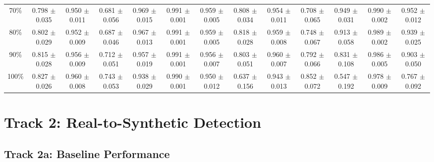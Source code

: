 \documentclass[11pt]{article}
\begin{document}
\begin{table}[ht]
{\begin{tabular}{ccccccccccccc}
70\% & 0.798 $\pm$ 0.035 & 0.950 $\pm$ 0.011 & 0.681 $\pm$ 0.056 & 0.969 $\pm$ 0.015 & 0.991 $\pm$ 0.001 & 0.959 $\pm$ 0.005 & 0.808 $\pm$ 0.034 & 0.954 $\pm$ 0.011 & 0.708 $\pm$ 0.065 & 0.949 $\pm$ 0.031 & 0.990 $\pm$ 0.002 & 0.952 $\pm$ 0.012 \\
80\% & 0.802 $\pm$ 0.029 & 0.952 $\pm$ 0.009 & 0.687 $\pm$ 0.046 & 0.967 $\pm$ 0.013 & 0.991 $\pm$ 0.001 & 0.959 $\pm$ 0.005 & 0.818 $\pm$ 0.028 & 0.959 $\pm$ 0.008 & 0.748 $\pm$ 0.067 & 0.913 $\pm$ 0.058 & 0.989 $\pm$ 0.002 & 0.939 $\pm$ 0.025 \\
90\% & 0.815 $\pm$ 0.028 & 0.956 $\pm$ 0.009 & 0.712 $\pm$ 0.051 & 0.957 $\pm$ 0.019 & 0.991 $\pm$ 0.001 & 0.956 $\pm$ 0.007 & 0.803 $\pm$ 0.051 & 0.960 $\pm$ 0.007 & 0.792 $\pm$ 0.066 & 0.831 $\pm$ 0.108 & 0.986 $\pm$ 0.005 & 0.903 $\pm$ 0.050 \\
100\% & 0.827 $\pm$ 0.026 & 0.960 $\pm$ 0.008 & 0.743 $\pm$ 0.053 & 0.938 $\pm$ 0.029 & 0.990 $\pm$ 0.001 & 0.950 $\pm$ 0.012 & 0.637 $\pm$ 0.156 & 0.943 $\pm$ 0.013 & 0.852 $\pm$ 0.072 & 0.547 $\pm$ 0.192 & 0.978 $\pm$ 0.009 & 0.767 $\pm$ 0.092 \\
\bottomrule
\end{tabular}
}
\end{table}


\clearpage
\section*{Track 2: Real-to-Synthetic Detection}

\subsection*{Track 2a: Baseline Performance}
\end{document}

